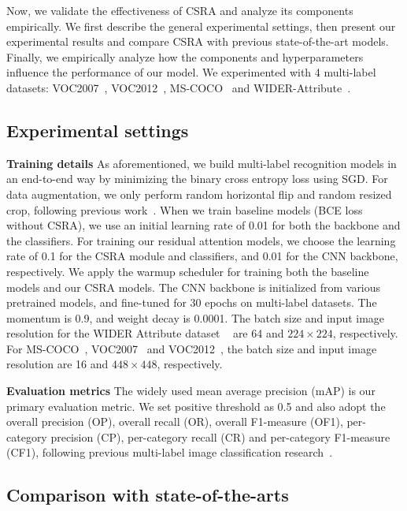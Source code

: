 \documentclass[10pt,twocolumn,letterpaper]{article}
\begin{document}
Now, we validate the effectiveness of CSRA and analyze its components empirically. We first describe the general experimental settings, then present our experimental results and compare CSRA with previous state-of-the-art models. Finally, we empirically analyze how the components and hyperparameters influence the performance of our model. We experimented with 4 multi-label datasets: VOC2007~\cite{VOC}, VOC2012~\cite{VOC2012}, MS-COCO~\cite{MSCOCO} and WIDER-Attribute~\cite{Wider}.

\subsection{Experimental settings}

\noindent\textbf{Training details} As aforementioned, we build multi-label recognition models in an end-to-end way by minimizing the binary cross entropy loss using SGD. For data augmentation, we only perform random horizontal flip and random resized crop, following previous work~\cite{2019_CVPR_GCN,2019_ICCV_GCNre}. When we train baseline models (BCE loss without CSRA), we use an initial learning rate of 0.01 for both the backbone and the classifiers. For training our residual attention models, we choose the learning rate of 0.1 for the CSRA module and classifiers, and 0.01 for the CNN backbone, respectively. We apply the warmup scheduler for training both the baseline models and our CSRA models. The CNN backbone is initialized from various pretrained models, and fine-tuned for 30 epochs on multi-label datasets. The momentum is 0.9, and weight decay is 0.0001. The batch size and input image resolution for the WIDER Attribute dataset ~\cite{Wider} are 64 and $224 \times 224$, respectively. For MS-COCO~\cite{MSCOCO}, VOC2007~\cite{VOC} and VOC2012~\cite{VOC2012}, the batch size and input image resolution are 16 and $448 \times 448$, respectively.

\vspace{6pt}\noindent\textbf{Evaluation metrics} The widely used mean average precision (mAP) is our primary evaluation metric. We set positive threshold as 0.5 and also adopt the overall precision (OP), overall recall (OR), overall F1-measure (OF1), per-category precision (CP), per-category recall (CR) and per-category F1-measure (CF1), following previous multi-label image classification research~\cite{2020_arxiv_Gaobb,2019_CVPR_GCN,2019_ICCV_GCNre,2019_CVPR_VA}.

\subsection{Comparison with state-of-the-arts}
\end{document}
